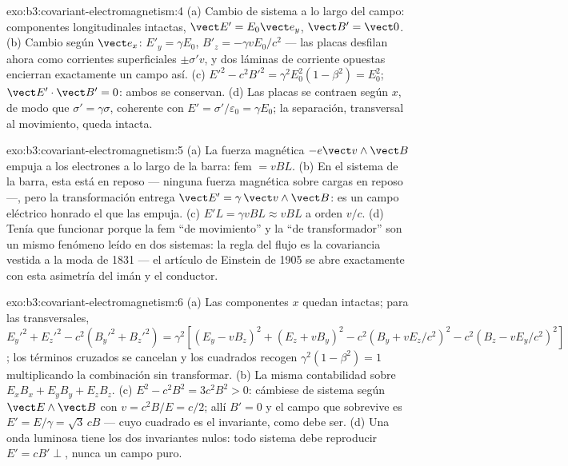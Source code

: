\begin{solution}{exo:b3:covariant-electromagnetism:4}
(a) Cambio de sistema a lo largo del campo: componentes longitudinales
intactas, $\vect
E' = E_0\vect e_y$, $\vect B' = \vect 0$. (b) Cambio según $\vect
e_x$: $E'_y = \gamma E_0$, $B'_z = -\gamma vE_0/c^2$ --- las placas
desfilan ahora como corrientes superficiales $\pm\sigma'v$, y dos láminas
de corriente opuestas encierran exactamente un campo así. (c) $E'^2 - c^2B'^2 =
\gamma^2E_0^2(1 - \beta^2) = E_0^2$; $\vect E'\cdot\vect B' = 0$: ambos se
conservan. (d) Las placas se contraen según $x$, de modo que $\sigma' =
\gamma\sigma$, coherente con $E' = \sigma'/\varepsilon_0 = \gamma
E_0$; la separación, transversal al movimiento, queda intacta.
\end{solution}

\begin{solution}{exo:b3:covariant-electromagnetism:5}
(a) La fuerza magnética $-e\vect v\wedge\vect B$ empuja a los electrones a
lo largo de la barra: fem $= vBL$. (b) En el sistema de la barra, esta está
en reposo --- ninguna fuerza magnética sobre cargas en reposo ---, pero la
transformación entrega $\vect E' = \gamma\,\vect v\wedge\vect B$:
es un campo eléctrico honrado el que las empuja. (c) $E'L = \gamma vBL
\approx vBL$ a orden $v/c$. (d) Tenía que funcionar porque la fem ``de
movimiento'' y la ``de transformador'' son un mismo fenómeno leído en dos
sistemas: la regla del flujo es la covariancia vestida a la moda de 1831 ---
el artículo de Einstein de 1905 se abre exactamente con esta asimetría del
imán y el conductor.
\end{solution}

\begin{solution}{exo:b3:covariant-electromagnetism:6}
(a) Las componentes $x$ quedan intactas; para las transversales,
$E_y'^2 + E_z'^2 - c^2(B_y'^2 + B_z'^2) = \gamma^2[(E_y - vB_z)^2 +
(E_z + vB_y)^2 - c^2(B_y + vE_z/c^2)^2 - c^2(B_z - vE_y/c^2)^2]$;
los términos cruzados se cancelan y los cuadrados recogen $\gamma^2(1 -
\beta^2) = 1$ multiplicando la combinación sin transformar. (b) La misma
contabilidad sobre $E_xB_x + E_yB_y + E_zB_z$. (c) $E^2 - c^2B^2 =
3c^2B^2 > 0$: cámbiese de sistema según $\vect E\wedge\vect B$ con $v = c^2B/E =
c/2$; allí $B' = 0$ y el campo que sobrevive es $E' = E/\gamma =
\sqrt3\,cB$ --- cuyo cuadrado es el invariante, como debe ser. (d) Una onda luminosa tiene los dos invariantes
nulos: todo sistema debe reproducir $E' = cB' \perp$, nunca un campo puro.
\end{solution}

